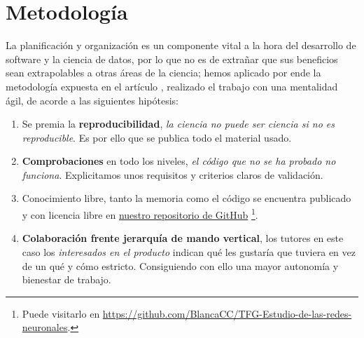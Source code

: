 %

\chapter{Metodología}
\label{ch00:methodology}
La planificación y organización es un componente vital a la hora del desarrollo de software 
y la ciencia de datos, por lo que no es de extrañar que sus beneficios sean extrapolables
a otras áreas de la ciencia; 
hemos aplicado por ende la 
metodología expuesta en el artículo \cite{DBLP:journals/corr/abs-2104-12545}, realizado 
el trabajo con una mentalidad ágil, de acorde a las siguientes hipótesis: 

\begin{enumerate}
    \item Se premia la \textbf{reproducibilidad}, \textit{la ciencia no puede ser ciencia si no es reproducible}. Es por 
    ello que se publica todo el material usado. 
    \item \textbf{Comprobaciones} en todo los niveles, \textit{el código que no se ha probado no funciona}. 
    Explicitamos unos requisitos y criterios claros de validación. 
    \item Conocimiento libre, tanto la memoria como el código se encuentra publicado y con licencia libre en \href{https://github.com/BlancaCC/TFG-Estudio-de-las-redes-neuronales}{nuestro repositorio 
    de GitHub} \footnote{Puede visitarlo en \url{https://github.com/BlancaCC/TFG-Estudio-de-las-redes-neuronales}.}.
    \item \textbf{Colaboración frente jerarquía de mando vertical}, los tutores en este caso 
    los \textit{interesados en el producto} 
    indican qué les gustaría que tuviera en vez de un qué y cómo estricto. Consiguiendo con ello una mayor autonomía y bienestar de trabajo.
     
\end{enumerate}  


